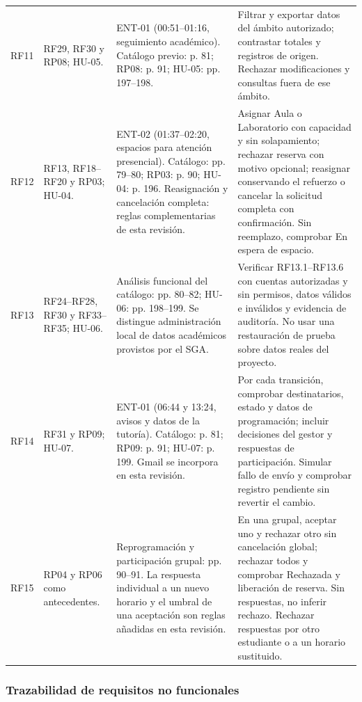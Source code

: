 \begin{longtable}{@{}p{}p{}p{}p{}@{}}
RF11 &
RF29, RF30 y RP08; HU-05. &
ENT-01 (00:51--01:16, seguimiento académico).
Catálogo previo: p. 81; RP08: p. 91;
HU-05: pp. 197--198. &
Filtrar y exportar datos del ámbito autorizado;
contrastar totales y registros de origen. Rechazar
modificaciones y consultas fuera de ese ámbito. \\

RF12 &
RF13, RF18--RF20 y RP03; HU-04. &
ENT-02 (01:37--02:20, espacios para atención presencial).
Catálogo: pp. 79--80; RP03: p. 90;
HU-04: p. 196. Reasignación y cancelación completa:
reglas complementarias de esta revisión. &
Asignar Aula o Laboratorio con capacidad y sin solapamiento;
rechazar reserva con motivo opcional; reasignar conservando
el refuerzo o cancelar la solicitud completa con confirmación.
Sin reemplazo, comprobar En espera de espacio. \\

RF13 &
RF24--RF28, RF30 y RF33--RF35; HU-06. &
Análisis funcional del catálogo: pp. 80--82;
HU-06: pp. 198--199. Se distingue administración
local de datos académicos provistos por el SGA. &
Verificar RF13.1--RF13.6 con cuentas autorizadas
y sin permisos, datos válidos e inválidos y evidencia
de auditoría. No usar una restauración de prueba sobre
datos reales del proyecto. \\

RF14 &
RF31 y RP09; HU-07. &
ENT-01 (06:44 y 13:24, avisos y datos de la tutoría).
Catálogo: p. 81; RP09: p. 91;
HU-07: p. 199. Gmail se incorpora en esta revisión. &
Por cada transición, comprobar destinatarios, estado
y datos de programación; incluir decisiones del gestor
y respuestas de participación. Simular fallo de envío
y comprobar registro pendiente sin revertir el cambio. \\

RF15 &
RP04 y RP06 como antecedentes. &
Reprogramación y participación grupal: pp. 90--91.
La respuesta individual a un nuevo horario y el umbral
de una aceptación son reglas añadidas en esta revisión. &
En una grupal, aceptar uno y rechazar otro sin cancelación
global; rechazar todos y comprobar Rechazada y liberación
de reserva. Sin respuestas, no inferir rechazo.
Rechazar respuestas por otro estudiante o a un horario sustituido. \\

\bottomrule
\end{longtable}
\subsubsection{Trazabilidad de requisitos no funcionales}

